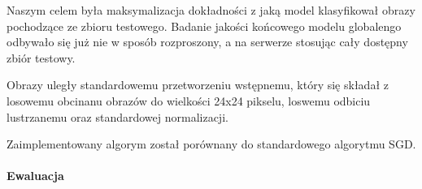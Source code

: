   Naszym celem była maksymalizacja dokładności z jaką model klasyfikował obrazy pochodzące ze
  zbioru testowego. Badanie jakości końcowego modelu globalengo odbywało się już nie w sposób
  rozproszony, a na serwerze stosując cały dostępny zbiór testowy.

  Obrazy uległy standardowemu przetworzeniu wstępnemu, który się składał z losowemu obcinanu obrazów do wielkości 24x24 pikselu, loswemu odbiciu lustrzanemu oraz standardowej normalizacji.

  Zaimplementowany algorym został porównany do standardowego algorytmu SGD.



  \paragraph{Ewaluacja}